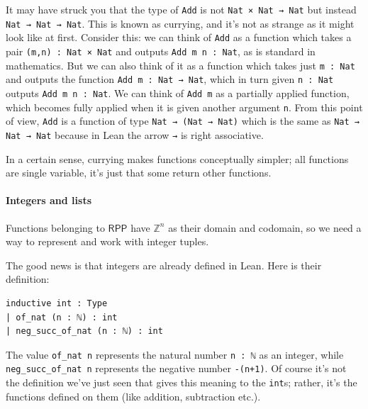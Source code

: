 \documentclass{book}
\theoremstyle{definition}
\theoremstyle{remark}
\theoremstyle{plain}
\newcommand{\ZZ}{\mathbb{Z}}
\newcommand{\RPP}{\mathsf{RPP}}
\begin{document}
It may have struck you that the type of \lstinline{Add} is not \lstinline{Nat × Nat → Nat}
but instead \lstinline{Nat → Nat → Nat}.
This is known as currying, and it's not as strange as it might look like at first.
Consider this: we can think of \lstinline{Add} as a function which takes a pair \lstinline{(m,n) : Nat × Nat} and outputs \lstinline{Add m n : Nat},
as is standard in mathematics.
But we can also think of it as a function which takes just \lstinline{m : Nat} and outputs the function \lstinline{Add m : Nat → Nat},
which in turn given \lstinline{n : Nat} outputs \lstinline{Add m n : Nat}.
We can think of \lstinline{Add m} as a partially applied function, which becomes fully applied when it is given another argument \lstinline{n}.
From this point of view, \lstinline{Add} is a function of type \lstinline{Nat → (Nat → Nat)} which is the same as
\lstinline{Nat → Nat → Nat} because in Lean the arrow \lstinline{→} is right associative.

In a certain sense, currying makes functions conceptually simpler;
all functions are single variable, it's just that some return other functions.

\paragraph{Integers and lists}
Functions belonging to $\RPP$ have $\ZZ^n$ as their domain and codomain,
so we need a way to represent and work with integer tuples.

The good news is that integers are already defined in Lean.
Here is their definition:
\begin{lstlisting}
inductive int : Type
| of_nat (n : ℕ) : int
| neg_succ_of_nat (n : ℕ) : int  
\end{lstlisting}
The value \lstinline{of_nat n} represents the natural number \lstinline{n : ℕ} as an integer,
while \lstinline{neg_succ_of_nat n} represents the negative number \lstinline{-(n+1)}.
Of course it's not the definition we've just seen that gives this meaning to the \lstinline{int}s;
rather, it's the functions defined on them (like addition, subtraction etc.).
\end{document}
